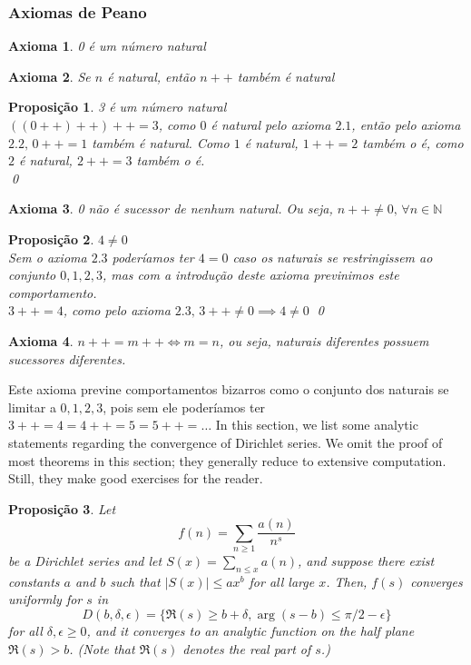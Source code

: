 \documentclass{article}
\newcommand{\NN}{\mathbb{N}}
\theoremstyle{plain}
\newtheorem{prop}{Proposição}
\newtheorem{axm}{Axioma}
\theoremstyle{remark}
\numberwithin{equation}{section}
\numberwithin{thm}{section}
\numberwithin{defn}{section}
\numberwithin{lemma}{section}
\numberwithin{axm}{section}
\begin{document}
\subsubsection{Axiomas de Peano}
\begin{axm}0 é um número natural\end{axm}
\begin{axm}Se \(n\) é natural, então \(n++\) também é natural\end{axm}
\begin{prop} 3 é um número natural\\
\(((0++)++)++ = 3\), como \(0\) é natural pelo axioma \(2.1\), então pelo axioma \(2.2, \, 0++ = 1\) também é natural. Como \(1\) é natural, \(1++ = 2\) também o é, como \(2\) é natural, \(2++ = 3\) também o é.\\
\qed
\end{prop}
\begin{axm}0 não é sucessor de nenhum natural. Ou seja, \(n++ \neq 0, \, \forall n \in \NN \)\end{axm}
\begin{prop} \(4 \neq 0\)\\
Sem o axioma \(2.3\) poderíamos ter \(4 = 0\) caso os naturais se restringissem ao conjunto \({0,1,2,3}\), mas com a introdução deste axioma previnimos este comportamento.\\
\(3++ = 4\), como pelo axioma \(2.3, \, 3++ \neq 0 \implies 4 \neq 0 \) \qed
\end{prop}
\begin{axm} \(n++ = m++ \iff m = n\), ou seja, naturais diferentes possuem sucessores diferentes.\end{axm}
Este axioma previne comportamentos bizarros como o conjunto dos naturais se limitar a \({0,1,2,3}\), pois sem ele poderíamos ter \(3++ = 4 = 4++ = 5 = 5++ = \dots \)
In this section, we list some analytic statements regarding the convergence of Dirichlet series. We omit the proof of most theorems in this section; they generally reduce to extensive computation. Still, they make good exercises for the reader.
\begin{prop} \label{2.1}
Let $$f(n) = \sum_{n \ge 1} \frac{a(n)}{n^s}$$ be a Dirichlet series and let $S(x) = \sum_{n \le x} a(n)$, and suppose there exist constants $a$ and $b$ such that $|S(x)| \le ax^b$ for all large $x$. Then, $f(s)$ converges uniformly for $s$ in $$D(b, \delta, \epsilon) = \{\Re(s) \ge b + \delta, \arg(s-b) \le \pi/2 - \epsilon\}$$ for all $\delta, \epsilon \ge 0$, and it converges to an analytic function on the half plane $\Re(s) > b$. (Note that $\Re(s)$ denotes the real part of $s$.)
\end{prop}
\end{document}
